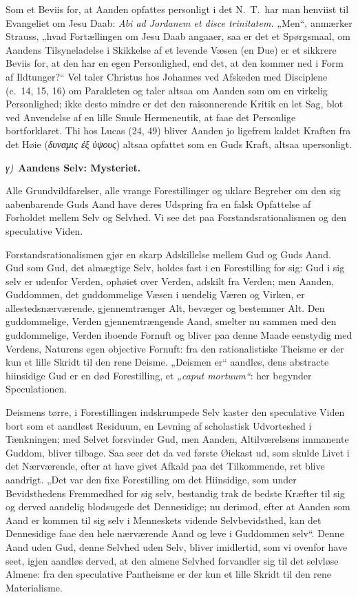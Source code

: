 \documentclass[12pt]{book}
\newcommand{\greekrun}[2]{%
  \medskip\begin{center}{\itshape #1)}\ {\bfseries #2}\end{center}\medskip}
\begin{document}
Som et Beviis for, at Aanden opfattes personligt i det N.\ T.\ har
man henviist til Evangeliet om Jesu Daab: \textit{Abi ad Jordanem et
disce trinitatem.} „Men“, anmærker Strauss, „hvad Fortællingen om
Jesu Daab angaaer, saa er det et Spørgsmaal, om Aandens
Tilsyneladelse i Skikkelse af et levende Væsen (en Due) er et
sikkrere Beviis for, at den har en egen Personlighed, end det, at
den kommer ned i Form af Ildtunger?“ Vel taler Christus hos
Johannes ved Afskeden med Disciplene (c.\ 14, 15, 16) om Parakleten
og taler altsaa om Aanden som om en virkelig Personlighed; ikke
desto mindre er det den raisonnerende Kritik en let Sag, blot ved
Anvendelse af en lille Smule Hermeneutik, at faae det Personlige
bortforklaret. Thi hos Lucas (24, 49) bliver Aanden jo ligefrem
kaldet Kraften fra det Høie (\textit{δυναμις ἐξ ὑψους}) altsaa
opfattet som en Guds Kraft, altsaa upersonligt.

\greekrun{γ}{Aandens Selv: Mysteriet.}

Alle Grundvildfarelser, alle vrange Forestillinger og uklare
Begreber om den sig aabenbarende Guds Aand have deres Udspring fra
en falsk Opfattelse af Forholdet
mellem Selv og Selvhed. Vi see det paa Forstandsrationalismen og den
speculative Viden.

Forstandsrationalismen gjør en skarp Adskillelse mellem Gud og Guds
Aand. Gud som Gud, det almægtige Selv, holdes fast i en Forestilling
for sig: Gud i sig selv er udenfor Verden, ophøiet over Verden,
adskilt fra Verden; men Aanden, Guddommen, det guddommelige Væsen i
uendelig Væren og Virken, er allestedsnærværende, gjennemtrænger
Alt, bevæger og bestemmer Alt. Den guddommelige, Verden
gjennemtrængende Aand, smelter nu sammen med den guddommelige,
Verden iboende Fornuft og bliver paa denne Maade eenstydig med
Verdens, Naturens egen objective Fornuft: fra den rationalistiske
Theisme er der kun et lille Skridt til den rene Deisme. „Deismen
er“ aandløs, dens abstracte hiinsidige Gud er en død Forestilling,
et \textit{„caput mortuum“}: her begynder Speculationen.

Deismens tørre, i Forestillingen indskrumpede Selv kaster den
speculative Viden bort som et aandløst Residuum, en Levning af
scholastisk Udvorteshed i Tænkningen; med Selvet forsvinder Gud,
men Aanden, Altilværelsens immanente Guddom, bliver tilbage. Saa
seer det da ved første Øiekast ud, som skulde Livet i det
Nærværende, efter at have givet Afkald paa det Tilkommende, ret
blive aandrigt. „Det var den fixe Forestilling om det Hiinsidige,
som under Bevidsthedens Fremmedhed for sig selv, bestandig trak de
bedste Kræfter til sig og derved aandelig blodsugede det
Dennesidige; nu derimod, efter at Aanden som Aand er kommen til sig
selv i Menneskets vidende Selvbevidsthed, kan det Dennesidige faae
den hele nærværende Aand og leve i Guddommen selv“. Denne Aand uden
Gud, denne Selvhed uden Selv, bliver imidlertid, som vi ovenfor have
seet, igjen aandløs derved, at den almene Selvhed forvandler sig til
det selvløse Almene: fra den speculative Pantheisme er der kun et
lille Skridt til den rene Materialisme.
\end{document}
